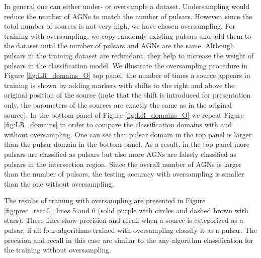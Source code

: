 In general one can either under- or oversample a dataset. Undersampling would reduce the number of AGNs to match the number of pulsars. However, since the total number of sources is not very high, we have chosen oversampling. 
For training with oversampling, we copy randomly existing pulsars and add them to the dataset until the number of pulsars and AGNs are the same.
Although pulsars in the training dataset are redundant, they help to increase the weight of pulsars in the classification model.
We illustrate the oversampling procedure in Figure \ref{fig:LR_domains_O} top panel:
the number of times a source appears in training is shown by adding markers with shifts to the right and above the original position of the source (note that the shift is introduced for presentation only, the parameters of the sources are exactly the same as in the original source).
In the bottom panel of Figure \ref{fig:LR_domains_O} we repeat Figure  \ref{fig:LR_domains} in order to compare the classification domains with and without oversampling.
One can see that pulsar domain in the top panel is larger than the pulsar domain in the bottom panel.
As a result, in the top panel more pulsars are classified as pulsars but also more AGNs are falsely classified as pulsars in the intersection region. 
Since the overall number of AGNs is larger than the number of pulsars, the testing accuracy with oversampling is smaller than the one without oversampling.

The results of training with oversampling are presented  in Figure \ref{fig:prec_recall},
lines 5 and 6 (solid purple with circles and dashed brown with stars). 
These lines show precision and recall when a source is categorized as a pulsar, if all four algorithms trained with oversampling classify it as a pulsar. 
The precision and recall in this case are similar to the any-algorithm classification for the training without oversampling.


